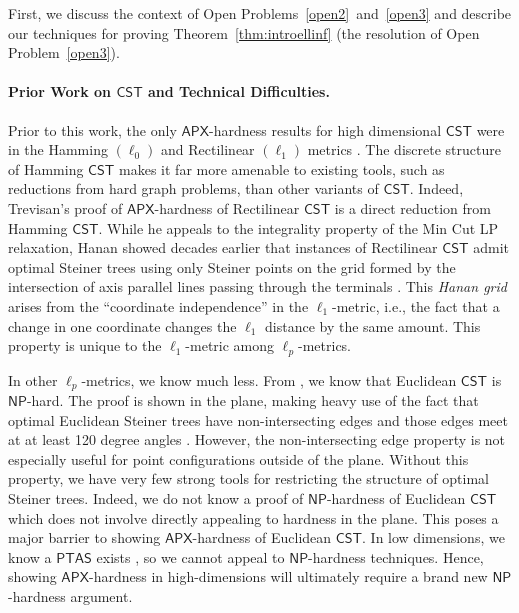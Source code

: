 \documentclass{article}\providecommand{\DeclareRedundantLanguages}[2]{}\usepackage[a4paper,margin=20mm]{geometry}
\newcommand{\1}{\textbf{1}}
\newcommand{\cst}{$\mathsf{CST}$\xspace}
\newcommand{\np}{$\mathsf{NP}$\xspace}
\newcommand{\apx}{$\mathsf{APX}$\xspace}
\newcommand{\ptas}{$\mathsf{PTAS}$\xspace}
\begin{document}
First, we discuss the context of Open Problems~\ref{open2}~and~\ref{open3} and describe our techniques for proving Theorem~\ref{thm:introellinf} (the resolution of Open Problem~\ref{open3}). 

\paragraph{\texorpdfstring{Prior Work on \cst and Technical Difficulties.}{Prior Work on CST and Technical Difficulties.}}
Prior to this work, the only \apx-hardness results for high dimensional \cst were in the Hamming $(\ell_0)$ and Rectilinear $(\ell_1)$ metrics \cite{Wareham_1995, Trevisan00}. The discrete structure of Hamming \cst makes it far more amenable to existing tools, such as reductions from hard graph problems, than other variants of \cst. Indeed, Trevisan's proof of \apx-hardness of Rectilinear \cst is a direct reduction from Hamming \cst. While he appeals to the integrality property of the Min Cut LP relaxation, Hanan showed decades earlier that instances of Rectilinear \cst admit optimal Steiner trees using only Steiner points on the grid formed by the intersection of axis parallel lines passing through the terminals \cite{Hanan_1966}. This \textit{Hanan grid} arises from the ``coordinate independence'' in the $\ell_1$-metric, i.e., the fact that a change in one coordinate changes the $\ell_1$ distance by the same amount. This property is unique to the $\ell_1$-metric among $\ell_p$-metrics.

In other $\ell_p$-metrics, we know much less. From \cite{Garey_Graham_Johnson_1977}, we know that Euclidean \cst is \np-hard. The proof is shown in the plane, making heavy use of the fact that optimal Euclidean Steiner trees have non-intersecting edges and those edges meet at at least 120 degree angles \cite{Gilbert_Pollak_1968}. However, the non-intersecting edge property is not especially useful for point configurations outside of the plane. Without this property, we have very few strong tools for restricting the structure of optimal Steiner trees. Indeed, we do not know a proof of \np-hardness of Euclidean \cst which does not involve directly appealing to hardness in the plane. This poses a major barrier to showing \apx-hardness of Euclidean \cst. In low dimensions, we know a \ptas exists \cite{Arora_1998}, so we cannot appeal to \np-hardness techniques. Hence, showing \apx-hardness in high-dimensions will ultimately require a brand new \np-hardness argument.
\end{document}
